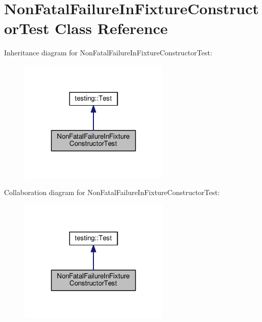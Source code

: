 \hypertarget{classNonFatalFailureInFixtureConstructorTest}{}\section{Non\+Fatal\+Failure\+In\+Fixture\+Constructor\+Test Class Reference}
\label{classNonFatalFailureInFixtureConstructorTest}


Inheritance diagram for Non\+Fatal\+Failure\+In\+Fixture\+Constructor\+Test\+:\nopagebreak
\begin{figure}[H]
\begin{center}
\leavevmode
\includegraphics[width=204pt]{classNonFatalFailureInFixtureConstructorTest__inherit__graph}
\end{center}
\end{figure}


Collaboration diagram for Non\+Fatal\+Failure\+In\+Fixture\+Constructor\+Test\+:\nopagebreak
\begin{figure}[H]
\begin{center}
\leavevmode
\includegraphics[width=204pt]{classNonFatalFailureInFixtureConstructorTest__coll__graph}
\end{center}
\end{figure}
